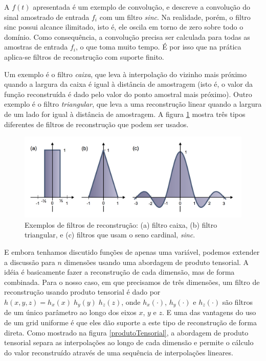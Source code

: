 \documentclass[12pt, a4paper, oneside]{book}
\begin{document}
A $f(t)$ apresentada é um exemplo de convolução, e descreve a convolução do sinal amostrado de entrada $f_{i}$ com um filtro {\it sinc}. Na realidade, porém, o filtro sinc possui alcance ilimitado, isto é, ele oscila em torno de zero sobre todo o domínio. Como consequência, a convolução precisa ser calculada para todas as amostras de entrada $f_{i}$, o que toma muito tempo. É por isso que na prática aplica-se filtros de reconstrução com suporte finito.

Um exemplo é o filtro {\it caixa}, que leva à interpolação do vizinho mais próximo quando a largura da caixa é igual à distância de amostragem (isto é, o valor da função reconstruída é dado pelo valor do ponto amostral mais próximo). Outro exemplo é o filtro {\it triangular}, que leva a uma reconstrução linear quando a largura de um lado for igual à distância de amostragem. A figura \ref{filters} mostra três tipos diferentes de filtros de reconstrução que podem ser usados. \\

\begin{figure}[!htb]
\center
\includegraphics[width=15cm]{recon_filters}
\caption{Exemplos de filtros de reconstrução: (a) filtro caixa, (b) filtro triangular, e (c) filtros que usam o seno cardinal, {\it sinc}.}
\label{filters}
\end{figure}

E embora tenhamos discutido funções de apenas uma variável, podemos extender a discussão para $n$ dimensões usando uma abordagem de produto tensorial. A idéia é basicamente fazer a reconstrução de cada dimensão, mas de forma combinada. Para o nosso caso, em que precisamos de três dimensões, um filtro de reconstrução usando produto tensorial é dado por $h(x,y,z) = h_{x}(x)\;h_{y}(y)\;h_{z}(z)$, onde $h_{x}(\cdotp)$, $h_{y}(\cdotp)$ e $h_{z}(\cdotp)$ são filtros de um único parâmetro ao longo dos eixos $x$, $y$ e $z$. E uma das vantagens do uso de um grid uniforme é que eles dão suporte a este tipo de reconstrução de forma direta. Como mostrado na figura \ref{produtoTensorial}, a abordagem de produto tensorial separa as interpolações ao longo de cada dimensão e permite o cálculo do valor reconstruído através de uma sequência de interpolações lineares.
\end{document}
